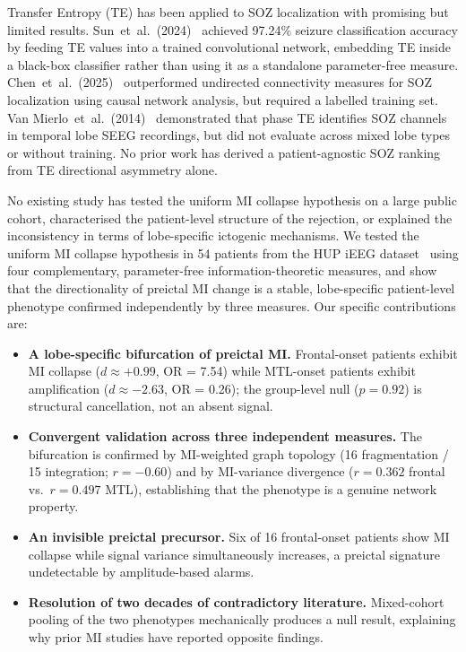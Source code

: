\documentclass[a4paper,fleqn]{cas-dc}
\begin{document}
Transfer Entropy (TE) has been applied to SOZ localization with
promising but limited results.
%
Sun~et~al.\ (2024)~\citep{zhao2024} achieved 97.24\% seizure
classification accuracy by feeding TE values into a trained
convolutional network, embedding TE inside a black-box classifier
rather than using it as a standalone parameter-free measure.
%
Chen~et~al.\ (2025)~\citep{concetti2024} outperformed undirected
connectivity measures for SOZ localization using causal network
analysis, but required a labelled training set.
%
Van Mierlo~et~al.\ (2014)~\citep{vanmierlo2013} demonstrated that
phase TE identifies SOZ channels in temporal lobe SEEG recordings, but
did not evaluate across mixed lobe types or without training.
%
No prior work has derived a patient-agnostic SOZ ranking from TE
directional asymmetry alone.

No existing study has tested the uniform MI collapse hypothesis on a
large public cohort, characterised the patient-level structure of the
rejection, or explained the inconsistency in terms of lobe-specific
ictogenic mechanisms.
%
We tested the uniform MI collapse hypothesis in 54 patients from the
HUP iEEG dataset~\citep{bernabei2023} using four complementary,
parameter-free information-theoretic measures, and show that the
directionality of preictal MI change is a stable, lobe-specific
patient-level phenotype confirmed independently by three measures.
%
Our specific contributions are:

\begin{itemize}
  \item \textbf{A lobe-specific bifurcation of preictal MI.}
        Frontal-onset patients exhibit MI collapse ($d \approx +0.99$,
        OR = 7.54) while MTL-onset patients exhibit amplification
        ($d \approx -2.63$, OR = 0.26); the group-level null ($p = 0.92$)
        is structural cancellation, not an absent signal.

  \item \textbf{Convergent validation across three independent measures.}
        The bifurcation is confirmed by MI-weighted graph topology
        (16 fragmentation / 15 integration; $r = -0.60$) and by
        MI-variance divergence ($r = 0.362$ frontal vs.\ $r = 0.497$
        MTL), establishing that the phenotype is a genuine network
        property.

  \item \textbf{An invisible preictal precursor.}
        Six of 16 frontal-onset patients show MI collapse while signal
        variance simultaneously increases, a preictal signature
        undetectable by amplitude-based alarms.

  \item \textbf{Resolution of two decades of contradictory literature.}
        Mixed-cohort pooling of the two phenotypes mechanically
        produces a null result, explaining why prior MI studies have
        reported opposite findings.
\end{itemize}
\end{document}
